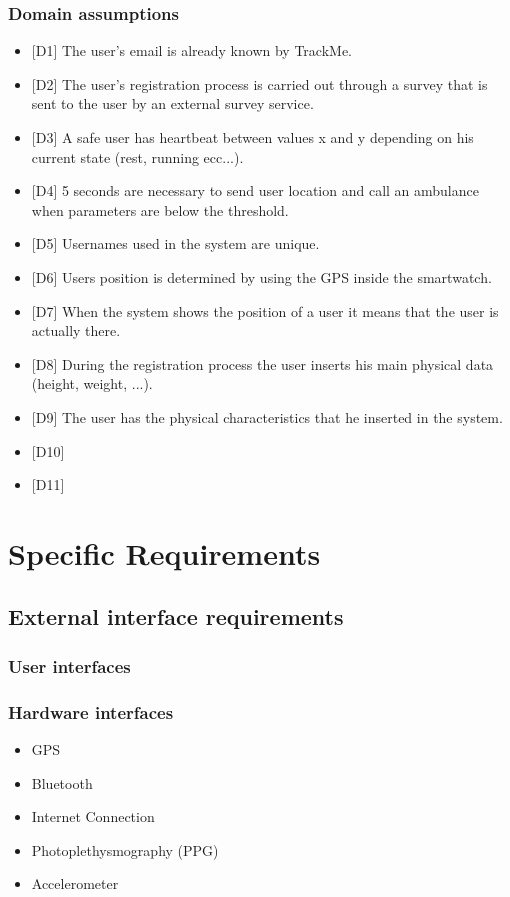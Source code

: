 \documentclass{article}
\begin{document}
\subsubsection{Domain assumptions}
\begin{itemize}
	\item {[D1]} The user's email is already known by TrackMe.
	\item {[D2]} The user's registration process is carried out through a survey that is sent to the user by an external survey service. 
	\item {[D3]} A safe user has heartbeat between values x and y depending on his current state (rest, running ecc...).
	\item {[D4]} 5 seconds are necessary to send user location and call an ambulance when parameters are below the threshold.
	\item {[D5]} Usernames used in the system are unique.
	\item {[D6]} Users position is determined by using the GPS inside the smartwatch.
	\item {[D7]} When the system shows the position of a user it means that the user is
actually there.
	\item {[D8]} During the registration process the user inserts his main physical data (height, weight, ...).
	\item {[D9]} The user has the physical characteristics that he inserted in the system.
	\item {[D10]}
	\item {[D11]}
\end{itemize}
\section{Specific Requirements}
\subsection{External interface requirements}
\subsubsection{User interfaces}
\subsubsection{Hardware interfaces}
\begin{itemize}
	\item GPS
	\item Bluetooth
	\item Internet Connection
	\item Photoplethysmography (PPG)
	\item Accelerometer
\end{itemize}
\end{document}
